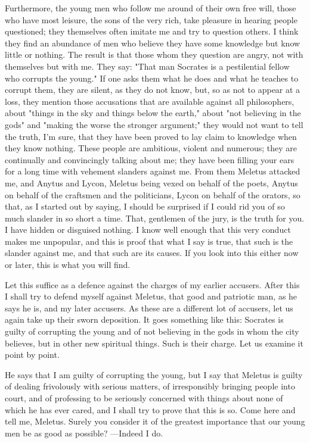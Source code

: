 Furthermore, the young men who follow me around of their own free will, those who have
most leisure, the sons of the very rich, take pleasure in hearing people questioned; they themselves
often imitate me and try to question others. I think they find an abundance of men who believe they
have some knowledge but know little or nothing. The result is that those whom they question are
angry, not with themselves but with me. They say: "That man Socrates is a pestilential fellow who
corrupts the young." If one asks them what he does and what he teaches to corrupt them, they are
silent, as they do not know, but, so as not to appear at a loss, they mention those accusations that
are available against all philosophers, about "things in the sky and things below the earth," about
"not believing in the gods" and "making the worse the stronger argument;" they would not want
to tell the truth, I'm sure, that they have been proved to lay claim to knowledge when they know
nothing. These people are ambitious, violent and numerous; they are continually and convincingly
talking about me; they have been filling your ears for a long time with vehement slanders against
me. From them Meletus attacked me, and Anytus and Lycon, Meletus being vexed on behalf of
the poets, Anytus on behalf of the craftsmen and the politicians, Lycon on behalf of the orators,
so that, as I started out by saying, I should be surprised if I could rid you of so much slander in so
short a time. That, gentlemen of the jury, is the truth for you. I have hidden or disguised nothing.
I know well enough that this very conduct makes me unpopular, and this is proof that what I say
is true, that such is the slander against me, and that such are its causes. If you look into this either
now or later, this is what you will find.

Let this suffice as a defence against the charges of my earlier accusers. After this I shall try
to defend myself against Meletus, that good and patriotic man, as he says he is, and my later
accusers. As these are a different lot of accusers, let us again take up their sworn deposition. It
goes something like this: Socrates is guilty of corrupting the young and of not believing in the gods
in whom the city believes, but in other new spiritual things. Such is their charge. Let us examine
it point by point.

He says that I am guilty of corrupting the young, but I say that Meletus is guilty of dealing
frivolously with serious matters, of irresponsibly bringing people into court, and of professing to
be seriously concerned with things about none of which he has ever cared, and I shall try to prove
that this is so. Come here and tell me, Meletus. Surely you consider it of the greatest importance
that our young men be as good as possible? —Indeed I do.

